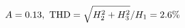 \documentclass[preview]{standalone}
\begin{document}
\begin{align*}
\special{dvisvgm:raw <g id='unique000'>}A=0.13,\ \text{THD}=\sqrt{H_2^2+H_3^2}/H_1=2.6\%\special{dvisvgm:raw </g>}
\end{align*}
\end{document}

